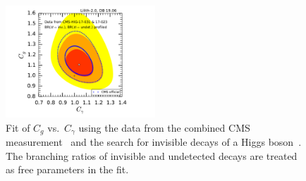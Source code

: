 \begin{figure}[h!]\centering
\includegraphics[width=0.5\textwidth]{validation/CMS/HIG-17-031-CgCGa_BRinvBRund_profiled.pdf}
\caption{Fit of $C_g$ vs.\ $C_\gamma$ using the data from the combined CMS measurement~\cite{Sirunyan:2018koj} and the 
search for invisible decays of a Higgs boson~\cite{Sirunyan:2018owy}. The branching ratios of invisible and undetected decays 
are treated as free parameters in the fit.}
\label{fig:validation_cms_inv}
\end{figure}

